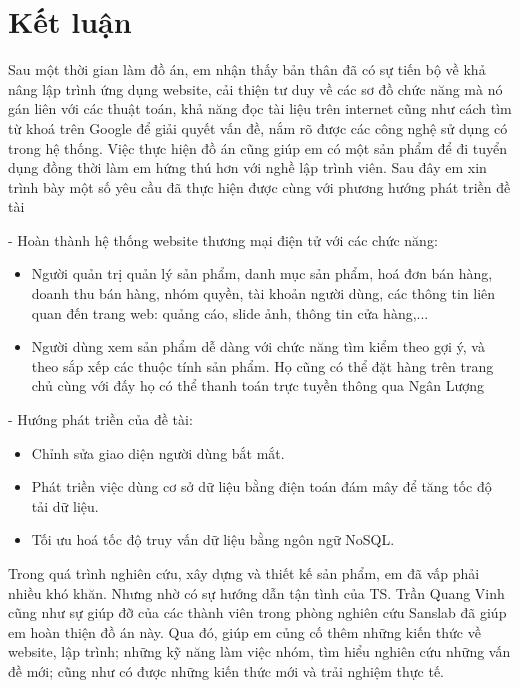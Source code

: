 \thispagestyle{plain}
\chapter*{Kết luận}
Sau một thời gian làm đồ án, em nhận thấy bản thân đã có sự tiến bộ về khả nâng lập trình ứng dụng website, cải thiện tư duy về các sơ đồ chức năng mà nó gán liên với các thuật toán, khả năng đọc tài liệu trên internet cũng như cách tìm từ khoá trên Google để giải quyết vấn đề, nắm rõ được các công nghệ sử dụng có trong hệ thống. Việc thực hiện đồ án cũng giúp em có một sản phẩm để đi tuyển dụng đồng thời làm em hứng thú hơn với nghề lập trình viên. Sau đây em xin trình bày một số yêu cầu đã thực hiện được cùng với phương hướng phát triền đề tài
\par
- Hoàn thành hệ thống website thương mại điện tử với các chức năng:
\begin{itemize}
	\item Người quản trị quản lý sản phẩm, danh mục sản phẩm, hoá đơn bán hàng, doanh thu bán hàng, nhóm quyền, tài khoản người dùng, các thông tin liên quan đến trang web: quảng cáo, slide ảnh, thông tin cửa hàng,...
	\item Người dùng xem sản phẩm dễ dàng với chức năng tìm kiểm theo gợi ý, và theo sắp xếp các thuộc tính sản phẩm. Họ cũng có thể đặt hàng trên trang chủ cùng với đấy họ có thể thanh toán trực tuyền thông qua Ngân Lượng 
\end{itemize}

- Hướng phát triền của đề tài:
\begin{itemize}
\item Chỉnh sửa giao diện người dùng bắt mắt.
\item Phát triền việc dùng cơ sở dữ liệu bằng điện toán đám mây để tăng tốc độ tải dữ liệu.
\item Tối ưu hoá tốc độ truy vấn dữ liệu bằng ngôn ngữ NoSQL.
\end{itemize}
\par 
Trong quá trình nghiên cứu, xây dựng và thiết kế sản phẩm, em đã vấp phải nhiều khó khăn. Nhưng nhờ có sự hướng dẫn tận tình của TS. Trần Quang Vinh cũng như sự giúp đỡ của các thành viên trong phòng nghiên cứu Sanslab đã giúp em hoàn thiện đồ án này. Qua đó, giúp em củng cố thêm những kiến thức về website, lập trình; những kỹ năng làm việc nhóm, tìm hiểu nghiên cứu những vấn đề mới; cũng như có được những kiến thức mới và trải nghiệm thực tế.